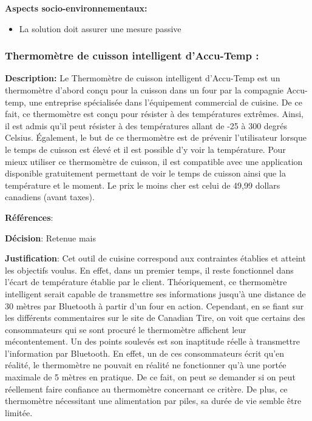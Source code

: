 \textbf{Aspects socio-environnementaux:}
\begin{itemize}[label = {--}]
    \item La solution doit assurer une mesure passive
\end{itemize}

\subsubsection{Thermomètre de cuisson intelligent d’Accu-Temp :}
\label{subsubsection:accu-temp}

\textbf{Description:} Le Thermomètre de cuisson intelligent d’Accu-Temp est un thermomètre d’abord conçu pour la cuisson dans un four par la compagnie Accu-temp, une entreprise spécialisée dans l’équipement commercial de cuisine. De ce fait, ce thermomètre est conçu pour résister à des températures extrêmes. Ainsi, il est admis qu’il peut résister à des températures allant de -25 à 300 degrés Celsius. Également, le but de ce thermomètre est de prévenir l’utilisateur lorsque le temps de cuisson est élevé et il est possible d’y voir la température. Pour mieux utiliser ce thermomètre de cuisson, il est compatible avec une application disponible gratuitement permettant de voir le temps de cuisson ainsi que la température et le moment. Le prix le moins cher est celui de 49,99 dollars canadiens (avant taxes).\vspace{5mm}

\textbf{Références}: \cite{Ares} \cite{AmAc} \cite{CaAc} \vspace{5mm}

\textbf{Décision}: Retenue mais

\textbf{Justification}: Cet outil de cuisine correspond aux contraintes établies et atteint les objectifs voulus. En effet, dans un premier temps, il reste fonctionnel dans l’écart de température établie par le client. Théoriquement, ce thermomètre intelligent serait capable de transmettre ses informations jusqu’à une distance de 30 mètres par Bluetooth à partir d’un four en action. Cependant, en se fiant sur les différents commentaires sur le site de Canadian Tire, on voit que certains des consommateurs qui se sont procuré le thermomètre affichent leur mécontentement. Un des points soulevés est son inaptitude réelle à transmettre l’information par Bluetooth. En effet, un de ces consommateurs écrit qu’en réalité, le thermomètre ne pouvait en réalité ne fonctionner qu’à une portée maximale de 5 mètres en pratique. De ce fait, on peut se demander si on peut réellement faire confiance au thermomètre concernant ce critère. De plus, ce thermomètre nécessitant une alimentation par piles, sa durée de vie semble être limitée.

